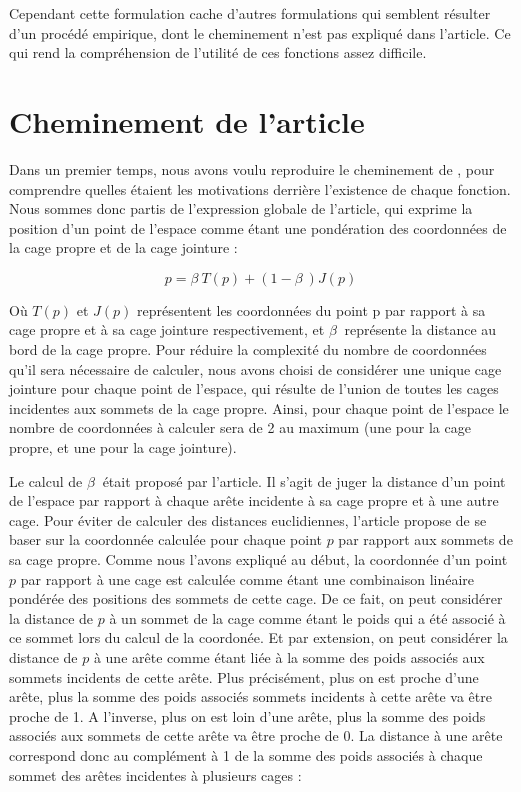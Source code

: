 Cependant cette formulation cache d'autres formulations qui semblent
résulter d'un procédé empirique, dont le cheminement n'est pas
expliqué dans l'article. Ce qui rend la compréhension de l'utilité de
ces fonctions assez difficile.

\section{Cheminement de l'article}
Dans un premier temps, nous avons voulu reproduire le cheminement de
\cite{GPCP13}, pour comprendre quelles étaient les motivations
derrière l'existence de chaque fonction. Nous sommes donc partis de
l'expression globale de l'article, qui exprime la position d'un point
de l'espace comme étant une pondération des coordonnées de la cage
propre et de la cage jointure :

\begin{equation}
  p = \beta~ T(p)  + (1 - \beta~) J(p) 
  \label{MELgen}
\end{equation}

Où $T(p)$ et $J(p)$ représentent les coordonnées du point p par
rapport à sa cage propre et à sa cage jointure respectivement, et
$\beta~$ représente la distance au bord de la cage propre. Pour
réduire la complexité du nombre de coordonnées qu'il sera nécessaire
de calculer, nous avons choisi de considérer une unique cage jointure
pour chaque point de l'espace, qui résulte de l'union de toutes les
cages incidentes aux sommets de la cage propre. Ainsi, pour chaque
point de l'espace le nombre de coordonnées à calculer sera de 2 au
maximum (une pour la cage propre, et une pour la cage jointure).

Le calcul de $\beta~$ était proposé par l'article. Il s'agit de juger
la distance d'un point de l'espace par rapport à chaque arête
incidente à sa cage propre et à une autre cage. Pour éviter de
calculer des distances euclidiennes, l'article propose de se baser sur
la coordonnée calculée pour chaque point $p$ par rapport aux sommets
de sa cage propre. Comme nous l'avons expliqué au début, la coordonnée
d'un point $p$ par rapport à une cage est calculée comme étant une
combinaison linéaire pondérée des positions des sommets de cette
cage. De ce fait, on peut considérer la distance de $p$ à un sommet de
la cage comme étant le poids qui a été associé à ce sommet lors du
calcul de la coordonée. Et par extension, on peut considérer la
distance de $p$ à une arête comme étant liée à la somme des poids
associés aux sommets incidents de cette arête. Plus précisément, plus
on est proche d'une arête, plus la somme des poids associés sommets
incidents à cette arête va être proche de 1. A l'inverse, plus on est
loin d'une arête, plus la somme des poids associés aux sommets de
cette arête va être proche de 0. La distance à une arête correspond
donc au complément à 1 de la somme des poids associés à chaque sommet
des arêtes incidentes à plusieurs cages :

